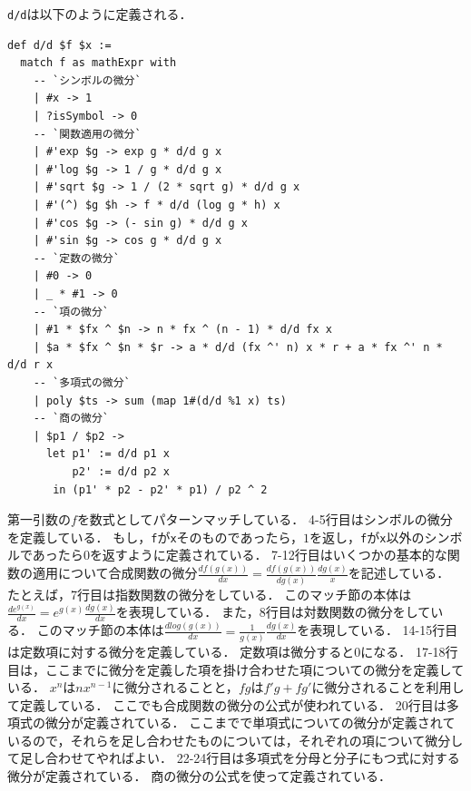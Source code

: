 \lstinline{d/d}は以下のように定義される．
\begin{lstlisting}[language=egison]
def d/d $f $x :=
  match f as mathExpr with
    -- `シンボルの微分`
    | #x -> 1
    | ?isSymbol -> 0
    -- `関数適用の微分`
    | #'exp $g -> exp g * d/d g x
    | #'log $g -> 1 / g * d/d g x
    | #'sqrt $g -> 1 / (2 * sqrt g) * d/d g x
    | #'(^) $g $h -> f * d/d (log g * h) x
    | #'cos $g -> (- sin g) * d/d g x
    | #'sin $g -> cos g * d/d g x
    -- `定数の微分`
    | #0 -> 0
    | _ * #1 -> 0
    -- `項の微分`
    | #1 * $fx ^ $n -> n * fx ^ (n - 1) * d/d fx x
    | $a * $fx ^ $n * $r -> a * d/d (fx ^' n) x * r + a * fx ^' n * d/d r x
    -- `多項式の微分`
    | poly $ts -> sum (map 1#(d/d %1 x) ts)
    -- `商の微分`
    | $p1 / $p2 ->
      let p1' := d/d p1 x
          p2' := d/d p2 x
       in (p1' * p2 - p2' * p1) / p2 ^ 2
\end{lstlisting}
第一引数の$f$を数式としてパターンマッチしている．
4-5行目はシンボルの微分を定義している．
もし，\lstinline{f}が\lstinline{x}そのものであったら，$1$を返し，\lstinline{f}が\lstinline{x}以外のシンボルであったら$0$を返すように定義されている．
7-12行目はいくつかの基本的な関数の適用について合成関数の微分$\frac{df(g(x))}{dx} = \frac{df(g(x))}{dg(x)} \frac{dg(x)}{x}$を記述している．
たとえば，7行目は指数関数の微分をしている．
このマッチ節の本体は$\frac{de^{g(x)}}{dx} = e^{g(x)} \frac{dg(x)}{dx}$を表現している．
また，8行目は対数関数の微分をしている．
このマッチ節の本体は$\frac{dlog(g(x))}{dx} = \frac{1}{g(x)} \frac{dg(x)}{dx}$を表現している．
14-15行目は定数項に対する微分を定義している．
定数項は微分すると$0$になる．
17-18行目は，ここまでに微分を定義した項を掛け合わせた項についての微分を定義している．
$x^n$は$n x^{n-1}$に微分されることと，$f g$は$f' g + f g'$に微分されることを利用して定義している．
ここでも合成関数の微分の公式が使われている．
20行目は多項式の微分が定義されている．
ここまでで単項式についての微分が定義されているので，それらを足し合わせたものについては，それぞれの項について微分して足し合わせてやればよい．
22-24行目は多項式を分母と分子にもつ式に対する微分が定義されている．
商の微分の公式を使って定義されている．
